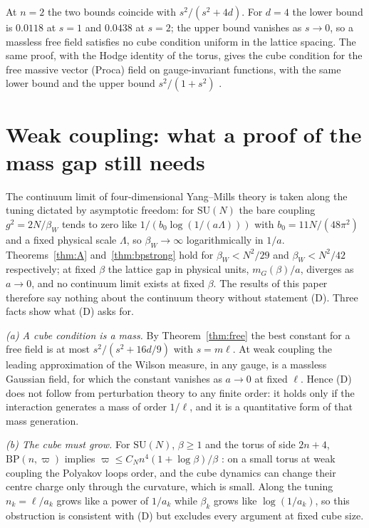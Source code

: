 \documentclass[11pt]{amsart}
\theoremstyle{definition}
\theoremstyle{remark}
\numberwithin{equation}{section}
\newcommand{\SU}{\mathrm{SU}}
\newcommand{\BP}{\mathrm{BP}}
\begin{document}
At $n=2$ the two bounds coincide with $s^2/(s^2+4d)$. For $d=4$ the lower
bound is $0.0118$ at $s=1$ and $0.0438$ at $s=2$; the upper bound vanishes as
$s\to0$, so a massless free field satisfies no cube condition uniform in the
lattice spacing. The same proof, with the Hodge identity of the torus, gives
the cube condition for the free massive vector (Proca) field on gauge-invariant
functions, with the same lower bound and the upper bound $s^2/(1+s^2)$
\cite{BBLRS26}.

\section{Weak coupling: what a proof of the mass gap still needs}\label{sec:weak}

The continuum limit of four-dimensional Yang--Mills theory is taken along the
tuning dictated by asymptotic freedom: for $\SU(N)$ the bare coupling
$g^2=2N/\beta_W$ tends to zero like $1/(b_0\log(1/(a\Lambda)))$ with
$b_0=11N/(48\pi^2)$ and a fixed physical scale $\Lambda$, so $\beta_W\to\infty$
logarithmically in $1/a$. Theorems~\ref{thm:A} and~\ref{thm:bpstrong} hold for
$\beta_W<N^2/29$ and $\beta_W<N^2/42$ respectively; at fixed $\beta$ the lattice
gap in physical units, $m_G(\beta)/a$, diverges as $a\to0$, and no continuum
limit exists at fixed $\beta$. The results of this paper therefore say nothing
about the continuum theory without statement (D). Three facts show what (D)
asks for.

\emph{(a) A cube condition is a mass.} By Theorem~\ref{thm:free} the best
constant for a free field is at most $s^2/(s^2+16d/9)$ with $s=m\ell$. At weak
coupling the leading approximation of the Wilson measure, in any gauge, is a
massless Gaussian field, for which the constant vanishes as $a\to0$ at fixed
$\ell$. Hence (D) does not follow from perturbation theory to any finite order:
it holds only if the interaction generates a mass of order $1/\ell$, and it is
a quantitative form of that mass generation.

\emph{(b) The cube must grow.} For $\SU(N)$, $\beta\ge1$ and the torus of side
$2n+4$, $\BP(n,\varpi)$ implies $\varpi\le C_Nn^4(1+\log\beta)/\beta$
\cite{BBLRS26}: on a small torus at weak coupling the Polyakov loops order, and
the cube dynamics can change their centre charge only through the curvature,
which is small. Along the tuning $n_k=\ell/a_k$ grows like a power of $1/a_k$
while $\beta_k$ grows like $\log(1/a_k)$, so this obstruction is consistent with
(D) but excludes every argument at fixed cube size.
\end{document}
